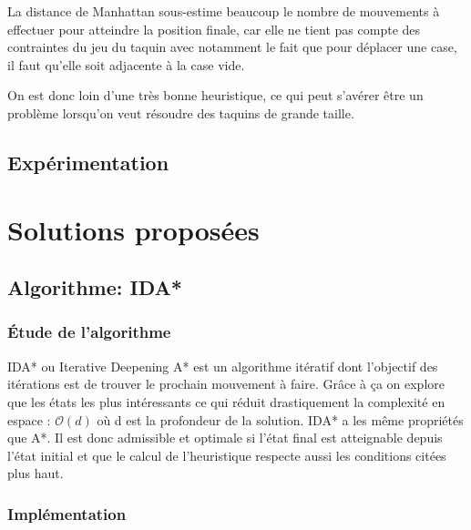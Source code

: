 \documentclass[a4paper, 12pt]{article}
\begin{document}
    La distance de Manhattan sous-estime beaucoup le nombre de mouvements à effectuer pour atteindre la position finale, car elle ne tient pas compte des contraintes du jeu du taquin avec notamment le fait que pour déplacer une case, il faut qu'elle soit adjacente à la case vide.
    
    On est donc loin d'une très bonne heuristique, ce qui peut s'avérer être un problème lorsqu'on veut résoudre des taquins de grande taille.
    
    \subsection{Expérimentation}

    \section{Solutions proposées}
    
    \subsection{Algorithme: IDA*}
    
    \subsubsection{Étude de l'algorithme}
    
    IDA* ou Iterative Deepening A* est un algorithme itératif dont l'objectif des itérations est de trouver le prochain mouvement à faire. 
    Grâce à ça on explore que les états les plus intéressants ce qui réduit drastiquement la complexité en espace : $\mathcal{O}(d)$ où d est la profondeur de la solution. 
    IDA* a les même propriétés que A*. Il est donc admissible et optimale si l'état final est atteignable depuis l'état initial et que le calcul de l'heuristique respecte aussi les conditions citées plus haut. 

    \subsubsection{Implémentation}
    
\end{document}
